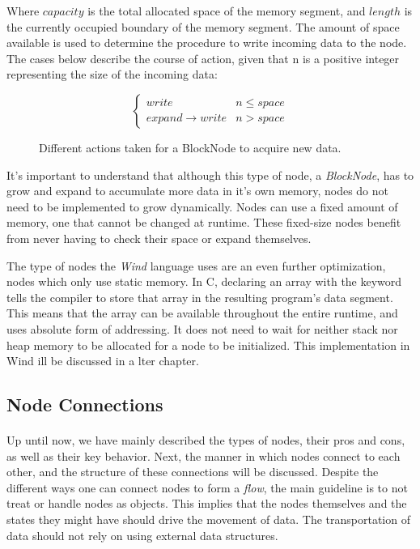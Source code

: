 Where $capacity$ is the total allocated space of the memory segment, and $length$ is the currently occupied boundary of the memory segment. The amount of space available is used to determine the procedure to write incoming data to the node. The cases below describe the course of action, given that n is a positive integer representing the size of the incoming data:

\begin{figure}[h]
\[ \begin{cases} 
      write & n \leq space \\
       expand \rightarrow write & n > space
   \end{cases}
\]
\caption{Different actions taken for a BlockNode to acquire new data.}
\end{figure}

\par It's important to understand that although this type of node, a \emph{BlockNode}, has to grow and expand to accumulate more data in it's own memory, nodes do not need to be implemented to grow dynamically. Nodes can use a fixed amount of memory, one that cannot be changed at runtime. These fixed-size nodes benefit from never having to check their space or expand themselves.
\par The type of nodes the \emph{Wind} language uses are an even further optimization, nodes which only use static memory. In C, declaring an array with the  keyword tells the compiler to store that array in the resulting program's data segment. This means that the array can be available throughout the entire runtime, and uses absolute form of addressing. It does not need to wait for neither stack nor heap memory to be allocated for a node to be initialized. This implementation in Wind ill be discussed in a lter chapter.

\subsection{Node Connections}

\paragraph{  } Up until now, we have mainly described the types of nodes, their pros and cons, as well as their key behavior. Next, the manner in which nodes connect to each other, and the structure of these connections will be discussed. Despite the different ways one can connect nodes to form a \emph{flow}, the main guideline is to not treat or handle nodes as objects. This implies that the nodes themselves and the states they might have should drive the movement of data. The transportation of data should not rely on using external data structures.

